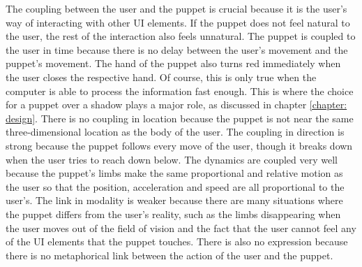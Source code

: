 The coupling between the user and the puppet is crucial because it is the user's way of interacting with other UI elements. If the puppet does not feel natural to the user, the rest of the interaction also feels unnatural. The puppet is coupled to the user in time because there is no delay between the user's movement and the puppet's movement. The hand of the puppet also turns red immediately when the user closes the respective hand. Of course, this is only true when the computer is able to process the information fast enough. This is where the choice for a puppet over a shadow plays a major role, as discussed in chapter \ref{chapter: design}. There is no coupling in location because the puppet is not near the same three-dimensional location as the body of the user. The coupling in direction is strong because the puppet follows every move of the user, though it breaks down when the user tries to reach down below.  The dynamics are coupled very well because the puppet's limbs make the same proportional and relative motion as the user so that the position, acceleration and speed are all proportional to the user's. The link in modality is weaker because there are many situations where the puppet differs from the user's reality, such as the limbs disappearing when the user moves out of the field of vision and the fact that the user cannot feel any of the UI elements that the puppet touches. There is also no expression because there is no metaphorical link between the action of the user and the puppet.\\


